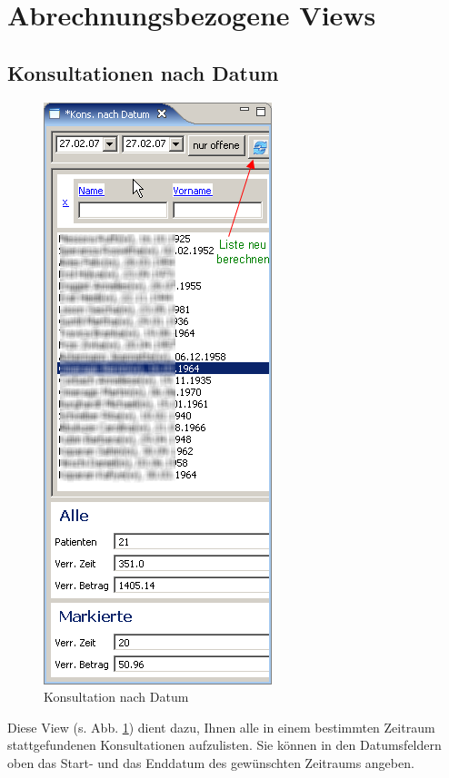 %

\section{Abrechnungsbezogene Views}
\subsection{Konsultationen nach Datum}
\begin{figure}[hb]
\includegraphics{images/konnd}
\caption{Konsultation nach Datum}
\label{fig:konnd}
\end{figure}
Diese View (s. Abb. \ref{fig:konnd}) dient dazu, Ihnen alle in einem bestimmten
Zeitraum stattgefundenen
Konsultationen aufzulisten. Sie können in den Datumsfeldern oben das Start- und
das Enddatum des gewünschten Zeitraums angeben.

